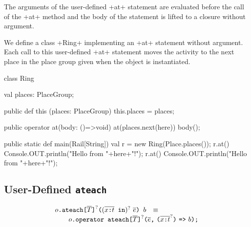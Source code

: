 The arguments of the user-defined \xcd+at+ statement are evaluated
before the call of the \xcd+at+ method and the body of the statement
is lifted to a closure without argument.


\begin{ex}
  We define a class \xcd+Ring+ implementing an \xcd+at+ statement
  without argument. Each call to this user-defined \xcd+at+ statement
  moves the activity to the next place in the place group given when
  the object is instantiated.
\begin{xten}
class Ring {
  val places: PlaceGroup;

  public def this (places: PlaceGroup) {
    this.places = places;
  }

  public operator at(body: ()=>void) {
    at(places.next(here)) { body(); }
  }
}
\end{xten}
%

\begin{xten}
public static def main(Rail[String]) {
  val r = new Ring(Place.places());
  r.at() {
    Console.OUT.println("Hello from "+here+"!");
    r.at() {
      Console.OUT.println("Hello from "+here+"!");
    }
  }
}
\end{xten}
\end{ex}


\subsection{User-Defined \texttt{ateach}}

$$
\begin{array}{rcl}
  \usrAteach{o}{\overline{T}}{\overline{\vardecl{x}{t}}}{\overline{e}}{b}
  & \equiv &
  \\
  \multicolumn{3}{r}{
  \qquad  \libAteach{o}{\overline{T}}{\overline{\vardecl{x}{t}}}{\overline{e}}{b}
  }
\end{array}
$$

